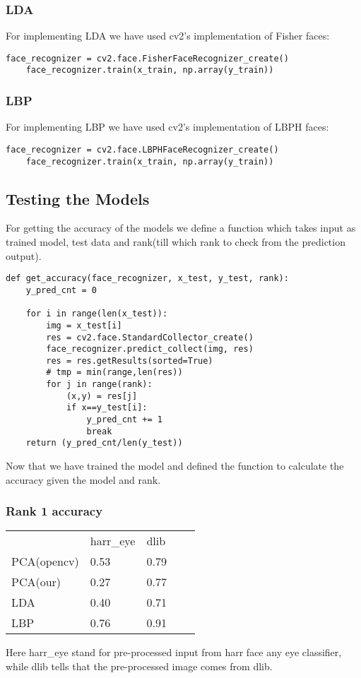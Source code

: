 \subsubsection{LDA}
For implementing LDA we have used cv2's implementation of Fisher faces:
    \begin{lstlisting}[style=Python]
    face_recognizer = cv2.face.FisherFaceRecognizer_create()
    face_recognizer.train(x_train, np.array(y_train))
    \end{lstlisting}
    
\subsubsection{LBP}
For implementing LBP we have used cv2's implementation of LBPH faces:
    \begin{lstlisting}[style=Python]
    face_recognizer = cv2.face.LBPHFaceRecognizer_create()
    face_recognizer.train(x_train, np.array(y_train))
    \end{lstlisting}

\subsection{Testing the Models}
For getting the accuracy of the models we define a function which takes input as trained model, test data and rank(till which rank to check from the prediction output).
    \begin{lstlisting}[style=Python]
    def get_accuracy(face_recognizer, x_test, y_test, rank):
	y_pred_cnt = 0

	for i in range(len(x_test)):
		img = x_test[i]
		res = cv2.face.StandardCollector_create()
		face_recognizer.predict_collect(img, res)
		res = res.getResults(sorted=True)
		# tmp = min(range,len(res))
		for j in range(rank):
			(x,y) = res[j]
			if x==y_test[i]:
				y_pred_cnt += 1
				break
	return (y_pred_cnt/len(y_test))
    \end{lstlisting}

Now that we have trained the model and defined the function to calculate the accuracy given the model and rank.

\subsubsection{Rank 1 accuracy}

\begin{table}[!ht]
\begin{tabular}{lllll}
    & harr\_eye & dlib &  &  \\
PCA(opencv) & 0.53      & 0.79 &  &  \\
PCA(our) & 0.27    & 0.77 &  &  \\
LDA & 0.40      & 0.71 &  &  \\
LBP & 0.76      & 0.91 &  & 
\end{tabular}
\end{table}
Here harr\_eye stand for pre-processed input from harr face any eye classifier, while dlib tells that the pre-processed image comes from dlib.

